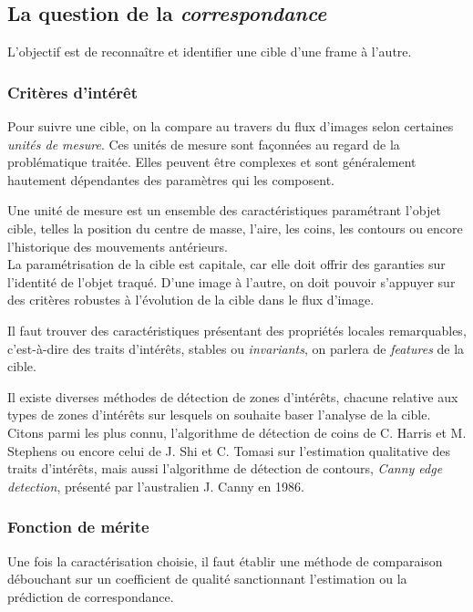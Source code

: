 \documentclass[a4paper,12pt]{report}
\begin{document}
\subsection{La question de la \textit{correspondance}}

L'objectif est de reconnaître et identifier une cible d'une frame à l'autre. \\

\subsubsection{Critères d'intérêt}
Pour suivre une cible, on la compare au travers du flux d'images selon certaines \textit{unités de mesure}.
Ces unités de mesure sont façonnées au regard de la problématique traitée. Elles peuvent \^etre complexes et sont généralement hautement dépendantes des paramètres qui les composent.

Une unité de mesure est un ensemble des caractéristiques paramétrant l'objet cible, telles la position du centre de masse, l'aire, les coins, les contours ou encore l'historique des mouvements antérieurs. \\

La paramétrisation de la cible est capitale, car elle doit offrir des garanties sur l'identité de l'objet traqué. 
D'une image à l'autre, on doit pouvoir s'appuyer sur des critères robustes à l'évolution de la cible dans le flux d'image.


Il faut trouver des caractéristiques présentant des propriétés locales remarquables, c'est-à-dire des traits d'intérêts, stables ou \textit{invariants}, on parlera de \textit{features} de la cible.

Il existe diverses méthodes de détection de zones d'intérêts, chacune relative aux types de zones d'intérêts sur lesquels on souhaite baser l'analyse de la cible. Citons parmi les plus connu, l'algorithme de détection de coins de C. Harris et M. Stephens ou encore celui de J. Shi et C. Tomasi sur l'estimation qualitative des traits d'intérêts, mais aussi l'algorithme de détection de contours, \textit{Canny edge detection}, présenté par l'australien J. Canny en 1986.\\

\subsubsection{Fonction de mérite}
Une fois la caractérisation choisie, il faut établir une méthode de comparaison débouchant sur un coefficient de qualité sanctionnant l'estimation ou la prédiction de correspondance.\\
\end{document}
